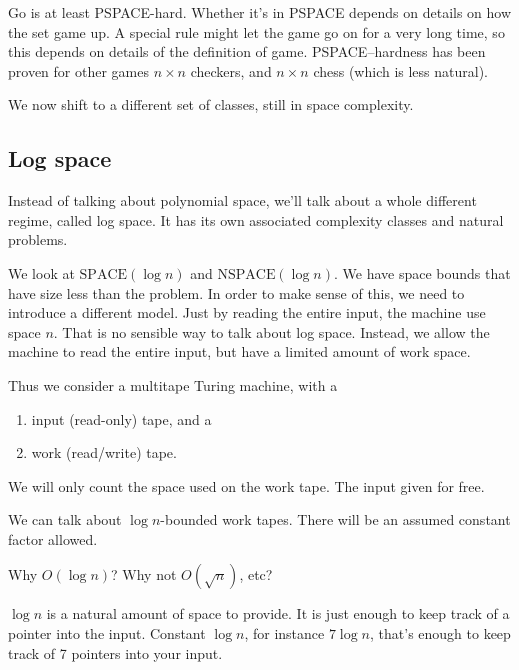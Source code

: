 Go is at least PSPACE-hard. Whether it's in PSPACE depends on details on how the set game up. A special rule might let the game go on for a very long time, so this depends on details of the definition of game. PSPACE--hardness has been proven for other games $n\times n$ checkers, and $n\times n$ chess (which is less natural).

We now shift to a different set of classes, still in space complexity.
\subsection{Log space}
Instead of talking about polynomial space, we'll talk about a whole different regime, called log space. It has its own associated complexity classes and natural problems.

We look at $\text{SPACE}(\log n)$ and $\text{NSPACE}(\log n)$. We have space bounds that have size less than the problem. In order to make sense of this, we need to introduce a different model. 
Just by reading the entire input, the machine use space $n$. That is no sensible way to talk about log space. Instead, we allow the machine to read the entire input, but have a limited amount of work space.

Thus we consider a multitape Turing machine, with a 
\begin{enumerate}
\item
input (read-only) tape, and a 
\item
work (read/write) tape.
\end{enumerate}
We will only count the space used on the work tape. The input given for free.


We can talk about $\log n$-bounded work tapes. There will be an assumed constant factor allowed. 



Why $O(\log n)$? Why not $O(\sqrt n)$, etc?

$\log n$ is a natural amount of space to provide. It is just enough to keep track of a pointer into the input. Constant $\log n$, for instance $7\log n$, that's enough to keep track of 7 pointers into your input.\\

